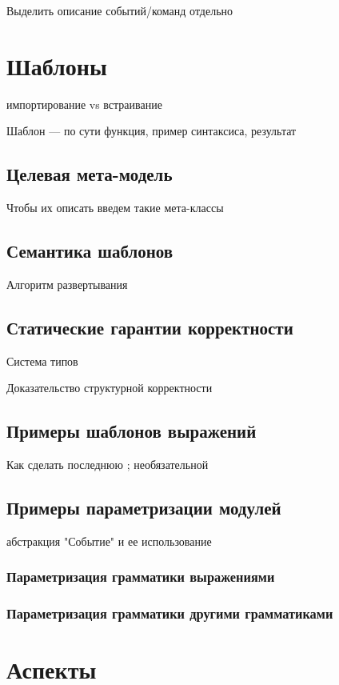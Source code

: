 Выделить описание событий/команд отдельно

\chapter{Шаблоны}

импортирование vs встраивание

Шаблон --- по сути функция, пример синтаксиса, результат

\section{Целевая мета-модель}
Чтобы их описать введем такие мета-классы

\section{Семантика шаблонов}
Алгоритм развертывания

\section{Статические гарантии корректности}
Система типов

Доказательство структурной корректности

\section{Примеры шаблонов выражений}

Как сделать последнюю ; необязательной

\section{Примеры параметризации модулей}

абстракция "Событие" и ее использование

\subsection{Параметризация грамматики выражениями}
\subsection{Параметризация грамматики другими грамматиками}

\chapter{Аспекты}

